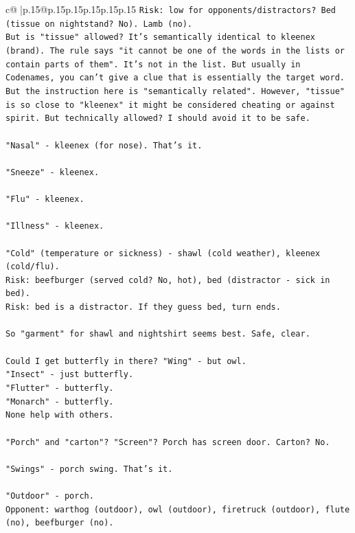 \documentclass{article}
\begin{document}
{\begin{supertabular}{c@{$\;$}|p{.15\linewidth}@{}p{.15\linewidth}p{.15\linewidth}p{.15\linewidth}p{.15\linewidth}p{.15\linewidth}}
{{{\texttt{Risk: low for opponents/distractors? Bed (tissue on nightstand? No). Lamb (no).} \\
\texttt{But is "tissue" allowed? It's semantically identical to kleenex (brand). The rule says "it cannot be one of the words in the lists or contain parts of them". It's not in the list. But usually in Codenames, you can't give a clue that is essentially the target word. But the instruction here is "semantically related". However, "tissue" is so close to "kleenex" it might be considered cheating or against spirit. But technically allowed? I should avoid it to be safe.} \\
\\ 
\texttt{"Nasal" {-} kleenex (for nose). That's it.} \\
\\ 
\texttt{"Sneeze" {-} kleenex.} \\
\\ 
\texttt{"Flu" {-} kleenex.} \\
\\ 
\texttt{"Illness" {-} kleenex.} \\
\\ 
\texttt{"Cold" (temperature or sickness) {-} shawl (cold weather), kleenex (cold/flu).} \\
\texttt{Risk: beefburger (served cold? No, hot), bed (distractor {-} sick in bed).} \\
\texttt{Risk: bed is a distractor. If they guess bed, turn ends.} \\
\\ 
\texttt{So "garment" for shawl and nightshirt seems best. Safe, clear.} \\
\\ 
\texttt{Could I get butterfly in there? "Wing" {-} but owl.} \\
\texttt{"Insect" {-} just butterfly.} \\
\texttt{"Flutter" {-} butterfly.} \\
\texttt{"Monarch" {-} butterfly.} \\
\texttt{None help with others.} \\
\\ 
\texttt{"Porch" and "carton"? "Screen"? Porch has screen door. Carton? No.} \\
\\ 
\texttt{"Swings" {-} porch swing. That's it.} \\
\\ 
\texttt{"Outdoor" {-} porch.} \\
\texttt{Opponent: warthog (outdoor), owl (outdoor), firetruck (outdoor), flute (no), beefburger (no).} \\
}}}
\end{supertabular}}
\end{document}
